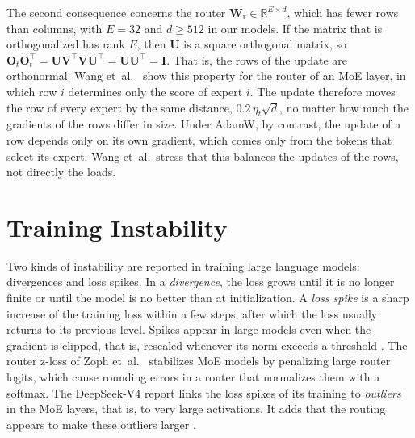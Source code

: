 The second consequence concerns the router $\mathbf{W}_{\mathrm{r}} \in \mathbb{R}^{E \times d}$, which has fewer rows than columns, with $E = 32$ and $d \geq 512$ in our models. If the matrix that is orthogonalized has rank $E$, then $\mathbf{U}$ is a square orthogonal matrix, so $\mathbf{O}_t \mathbf{O}_t^{\top} = \mathbf{U} \mathbf{V}^{\top} \mathbf{V} \mathbf{U}^{\top} = \mathbf{U} \mathbf{U}^{\top} = \mathbf{I}$. That is, the rows of the update are orthonormal. Wang et~al.~\cite{wang2026depth} show this property for the router of an MoE layer, in which row $i$ determines only the score of expert $i$. The update therefore moves the row of every expert by the same distance, $0.2 \, \eta_t \sqrt{d}$, no matter how much the gradients of the rows differ in size. Under AdamW, by contrast, the update of a row depends only on its own gradient, which comes only from the tokens that select its expert. Wang et~al.\ stress that this balances the updates of the rows, not directly the loads.

\section{Training Instability}
\label{sec:background-instability}
Two kinds of instability are reported in training large language models: divergences and loss spikes. In a \emph{divergence}, the loss grows until it is no longer finite or until the model is no better than at initialization. A \emph{loss spike} is a sharp increase of the training loss within a few steps, after which the loss usually returns to its previous level. Spikes appear in large models even when the gradient is clipped, that is, rescaled whenever its norm exceeds a threshold \cite{chowdhery2023palm, pascanu2013difficulty}. The router z-loss of Zoph et~al.~\cite{zoph2022stmoe} stabilizes MoE models by penalizing large router logits, which cause rounding errors in a router that normalizes them with a softmax. The DeepSeek-V4 report links the loss spikes of its training to \emph{outliers} in the MoE layers, that is, to very large activations. It adds that the routing appears to make these outliers larger \cite{deepseek2026v4}.
